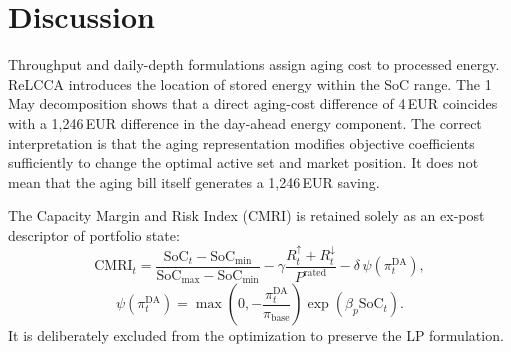 \documentclass[journal,12pt,twocolumn]{IEEEtran}
\begin{document}
\begin{table}[!t]
\caption{Robustness and Sensitivity Checks for the ReLCCA P1$-$B2 Differential}
\label{tab:robustness}
\centering
\footnotesize
{}
\end{table}

\section{Discussion}
\label{sec:discussion}

Throughput and daily-depth formulations assign aging cost to processed energy. ReLCCA introduces the location of stored energy within the SoC range. The 1 May decomposition shows that a direct aging-cost difference of 4\,EUR coincides with a 1{,}246\,EUR difference in the day-ahead energy component. The correct interpretation is that the aging representation modifies objective coefficients sufficiently to change the optimal active set and market position. It does not mean that the aging bill itself generates a 1{,}246\,EUR saving.

The Capacity Margin and Risk Index (CMRI) is retained solely as an ex-post descriptor of portfolio state:
\begin{equation}
\text{CMRI}_t = \frac{\text{SoC}_t - \text{SoC}_{\min}}{\text{SoC}_{\max} - \text{SoC}_{\min}} - \gamma \frac{R_t^{\uparrow} + R_t^{\downarrow}}{P^{\text{rated}}} - \delta \, \psi(\pi_t^{\text{DA}}),
\label{eq:cmri}
\end{equation}
\begin{equation}
\psi(\pi_t^{\text{DA}}) = \max\left(0, -\frac{\pi_t^{\text{DA}}}{\pi_{\text{base}}}\right) \exp(\beta_p \text{SoC}_t).
\label{eq:psi}
\end{equation}
It is deliberately excluded from the optimization to preserve the LP formulation.
\end{document}
